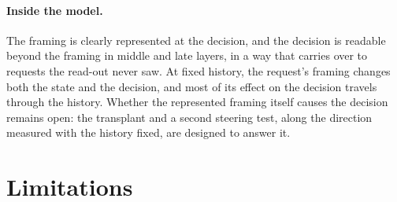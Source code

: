 \documentclass[11pt]{article}
\begin{document}
\paragraph{Inside the model.} The framing is clearly represented at the decision, and the decision is readable
beyond the framing in middle and late layers, in a way that carries over to requests the read-out never saw. At fixed
history, the request's framing changes both the state and the decision, and most of its effect on the decision travels
through the history. Whether the represented framing itself causes the decision remains open: the transplant and a second
steering test, along the direction measured with the history fixed, are designed to answer it.

\section{Limitations}
\end{document}
